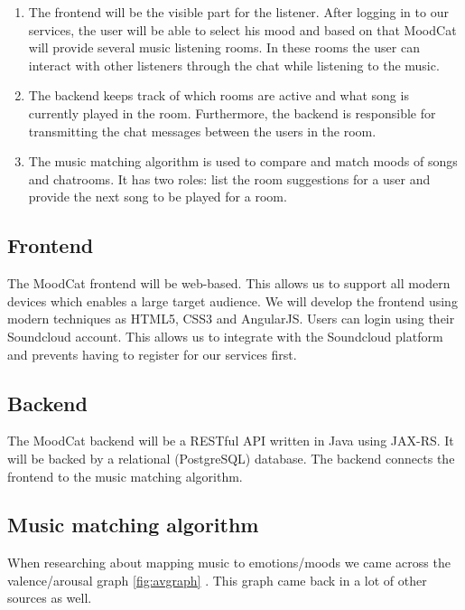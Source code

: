 \documentclass[10pt,a4paper]{article}
\begin{document}
\begin{enumerate}
\item The frontend will be the visible part for the listener.
After logging in to our services, the user will be able to select his mood and based on that MoodCat will provide several music listening rooms.
In these rooms the user can interact with other listeners through the chat while listening to the music.

\item The backend keeps track of which rooms are active and what song is currently played in the room.
Furthermore, the backend is responsible for transmitting the chat messages between the users in the room.

\item The music matching algorithm is used to compare and match moods of songs and chatrooms.
It has two roles: list the room suggestions for a user and provide the next song to be played for a room.
\end{enumerate}

\newpage

\subsection{Frontend}

The MoodCat frontend will be web-based. This allows us to support all modern devices which enables a large target audience. We will develop the frontend using modern techniques as HTML5, CSS3 and AngularJS. Users can login using their Soundcloud account. This allows us to integrate with the Soundcloud platform and prevents having to register for our services first.

\subsection{Backend}

The MoodCat backend will be a RESTful API written in Java using JAX-RS. It will be backed by a relational (PostgreSQL) database. The backend connects the frontend to the music matching algorithm.

\subsection{Music matching algorithm}

When researching about mapping music to emotions/moods we came across the valence/arousal graph \ref{fig:avgraph} \cite{Book}.
This graph came back in a lot of other sources as well.
\end{document}
